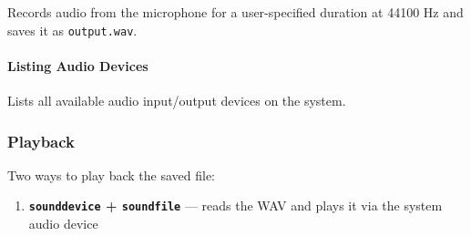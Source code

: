 \begin{Shaded}
\begin{Highlighting}[]
\OperatorTok{=} 
\OperatorTok{=} \NormalTok{(}\NormalTok{(}\NormalTok{))}
\NormalTok{(}\NormalTok{)}
\OperatorTok{=}\OperatorTok{*}\OperatorTok{=}\OperatorTok{=}\NormalTok{)}
\NormalTok{(}\NormalTok{)}
\end{Highlighting}
\end{Shaded}

Records audio from the microphone for a user-specified duration at 44100
Hz and saves it as \texttt{output.wav}.

\paragraph{Listing Audio Devices}\label{listing-audio-devices}

\begin{Shaded}
\begin{Highlighting}[]
\end{Highlighting}
\end{Shaded}

Lists all available audio input/output devices on the system.

\subsubsection{Playback}\label{playback}

Two ways to play back the saved file:

\begin{enumerate}
\def\labelenumi{\arabic{enumi}.}
\tightlist
\item
  \textbf{\texttt{sounddevice} + \texttt{soundfile}} --- reads the WAV
  and plays it via the system audio device
\end{enumerate}

\begin{Shaded}
\begin{Highlighting}[]

\OperatorTok{=}\OperatorTok{=}\NormalTok{)}
\end{Highlighting}
\end{Shaded}

